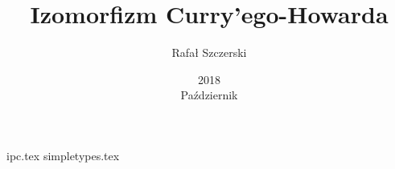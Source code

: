 \documentclass[a4paper,oneside,reqno,10pt]{article}
\title{Izomorfizm Curry'ego-Howarda}
\date{2018\\ Październik}
\author{Rafał Szczerski}
\begin{document}
\maketitle
{ipc.tex}
{simpletypes.tex}


\end{document}
